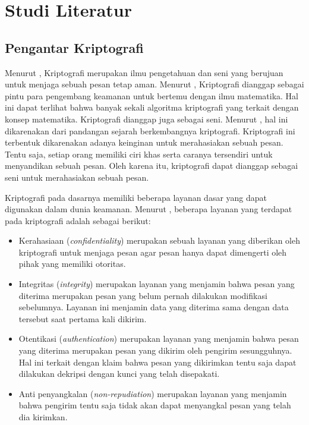 \chapter{Studi Literatur}

\section{Pengantar Kriptografi}
Menurut \textcite{schneier1996}, Kriptografi merupakan ilmu pengetahuan dan seni yang berujuan untuk menjaga sebuah pesan tetap aman. Menurut \textcite{anderson2008}, Kriptografi dianggap sebagai pintu para pengembang keamanan untuk bertemu dengan ilmu matematika. Hal ini dapat terlihat bahwa banyak sekali algoritma kriptografi yang terkait dengan konsep matematika. Kriptografi dianggap juga sebagai seni. Menurut \textcite{munir2019}, hal ini dikarenakan dari pandangan sejarah berkembangnya kriptografi. Kriptografi ini terbentuk dikarenakan adanya keinginan untuk merahasiakan sebuah pesan. Tentu saja, setiap orang memiliki ciri khas serta caranya tersendiri untuk menyandikan sebuah pesan. Oleh karena itu, kriptografi dapat dianggap sebagai seni untuk merahasiakan sebuah pesan. 

Kriptografi pada dasarnya memiliki beberapa layanan dasar yang dapat digunakan dalam dunia keamanan. Menurut \textcite{schneier1996}, beberapa layanan yang terdapat pada kriptografi adalah sebagai berikut:
\begin{itemize}
  \item Kerahasiaan (\emph{confidentiality}) merupakan sebuah layanan yang diberikan oleh kriptografi untuk menjaga pesan agar pesan hanya dapat dimengerti oleh pihak yang memiliki otoritas. 
  \item Integritas (\emph{integrity}) merupakan layanan yang menjamin bahwa pesan yang diterima merupakan pesan yang belum pernah dilakukan modifikasi sebelumnya. Layanan ini menjamin data yang diterima sama dengan data tersebut saat pertama kali dikirim.
  \item Otentikasi (\emph{authentication}) merupakan layanan yang menjamin bahwa pesan yang diterima merupakan pesan yang dikirim oleh pengirim sesungguhnya. Hal ini terkait dengan klaim bahwa pesan yang dikirimkan tentu saja dapat dilakukan dekripsi dengan kunci yang telah disepakati.
  \item Anti penyangkalan (\emph{non-repudiation}) merupakan layanan yang menjamin bahwa pengirim tentu saja tidak akan dapat menyangkal pesan yang telah dia kirimkan.
\end{itemize} 

